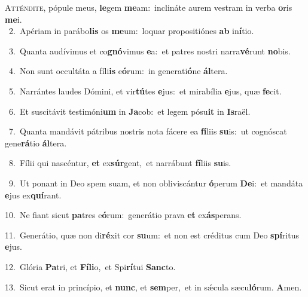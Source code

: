 \lettrine{\initial\textcolor{\initialcolor}{A}}{tténdite,} pópule meus, \textbf{le}\-gem \textbf{me}\-am:~\star inclináte aurem vestram in verba \textbf{o}\-ris \textbf{me}\-i.\\
{\numbfont\textcolor{\numbcolor}{~2.}}~Apériam in parábo\textbf{lis} os \textbf{me}\-um:~\star loquar propositiónes \textbf{ab} in\-\textbf{í}\-tio.\par
{\numbfont\textcolor{\numbcolor}{~3.}}~Quanta audívimus et co\-\textbf{gnó}\-vimus \textbf{e}\-a:~\star et patres nostri narra\-\textbf{vé}\-runt \textbf{no}\-bis.\par
{\numbfont\textcolor{\numbcolor}{~4.}}~Non sunt occultáta a fíli\textbf{is} e\-\textbf{ó}\-rum:~\star in generati\-\textbf{ó}\-ne \textbf{ál}\-tera.\par
{\numbfont\textcolor{\numbcolor}{~5.}}~Narrántes laudes Dómini, et vir\-\textbf{tú}\-tes \textbf{e}\-jus:~\star et mirabília \textbf{e}\-jus, quæ \textbf{fe}\-cit.\par
{\numbfont\textcolor{\numbcolor}{~6.}}~Et suscitávit testimóni\textbf{um} in \textbf{Ja}\-cob:~\star et legem pósu\textbf{it} in \textbf{Is}\-raël.\par
{\numbfont\textcolor{\numbcolor}{~7.}}~Quanta mandávit pátribus nostris nota fácere ea \textbf{fí}\-liis \textbf{su}\-is:~\star ut cognóscat gene\-\textbf{rá}\-tio \textbf{ál}\-tera.\par
{\numbfont\textcolor{\numbcolor}{~8.}}~Fílii qui nascéntur, \textbf{et} ex\-\textbf{súr}\-gent,~\star et narrábunt \textbf{fí}\-liis \textbf{su}\-is.\par
{\numbfont\textcolor{\numbcolor}{~9.}}~Ut ponant in Deo spem suam, et non obliviscántur \textbf{ó}\-perum \textbf{De}\-i:~\star et mandáta \textbf{e}\-jus ex\-\textbf{quí}\-rant.\par
{\numbfont\textcolor{\numbcolor}{10.}}~Ne fiant sicut \textbf{pa}\-tres e\-\textbf{ó}\-rum:~\star generátio prava \textbf{et} ex\-\textbf{ás}\-perans.\par
{\numbfont\textcolor{\numbcolor}{11.}}~Generátio, quæ non di\-\textbf{ré}\-xit cor \textbf{su}\-um:~\star et non est créditus cum Deo \textbf{spí}\-ritus \textbf{e}\-jus.\par
{\numbfont\textcolor{\numbcolor}{12.}}~Glória \textbf{Pa}\-tri, et \textbf{Fí}\-\textbf{li}o,~\star et Spi\-\textbf{rí}\-tui \textbf{Sanc}\-to.\par
{\numbfont\textcolor{\numbcolor}{13.}}~Sicut erat in princípio, et \textbf{nunc}\-, et \textbf{sem}\-per,~\star et in sǽcula sæcu\-\textbf{ló}\-rum. \textbf{A}\-men.\par
